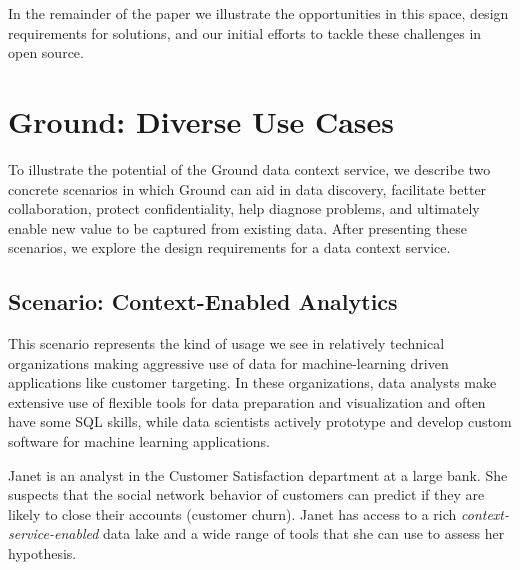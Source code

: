 \documentclass{sig-alternate}
\begin{document}
In the remainder of the paper we illustrate the opportunities in this space, design requirements for solutions, and our initial efforts to tackle these challenges in open source.

\section{Ground: Diverse Use Cases}
\label{sec:scenarios}
To illustrate the potential of the Ground data context service, we describe two concrete scenarios in which Ground
can aid in data discovery, facilitate better collaboration, protect confidentiality, help diagnose problems, and ultimately enable new value to be captured from existing data.
After presenting these scenarios, we explore the design requirements for a data context service.


\subsection{Scenario: Context-Enabled Analytics }
This scenario represents the kind of usage we see in relatively technical organizations making aggressive use of data for machine-learning driven applications like customer targeting. In these organizations, data analysts make extensive use of flexible tools for data preparation and visualization and often have some SQL skills, while data scientists actively prototype and develop custom software for machine learning applications.

Janet is an 
analyst in the Customer Satisfaction department at a large bank. 
She suspects that the social network behavior of customers can predict if they are likely to close their accounts (customer churn).
Janet has access to a rich \emph{context-service-enabled} data lake and a wide range of tools that she can use 
to assess her hypothesis. 
\end{document}
